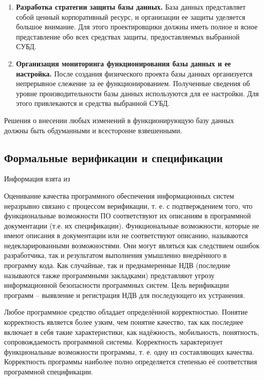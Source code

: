 \begin{enumerate}
    \item \textbf{Разработка стратегии защиты базы данных.}
        База данных представляет собой ценный корпоративный ресурс, и организации ее защиты уделяется большое
        внимание. Для этого проектировщики должны иметь полное и ясное представление обо всех средствах защиты,
        предоставляемых выбранной СУБД.

    \item \textbf{Организация мониторинга функционирования базы данных и ее настройка.}
        После создания физического проекта базы данных организуется непрерывное слежение за ее функционированием.
        Полученные сведения об уровне производительности базы данных используются для ее настройки. Для этого
        привлекаются и средства выбранной СУБД.
\end{enumerate}

Решения о внесении любых изменений в функционирующую базу данных должны быть обдуманными и всесторонне взвешенными.

\subsection{Формальные верификации и спецификации}
Информация взята из \autocite{Glukharev}

Оценивание качества программного обеспечения информационных систем неразрывно связано с процессом верификации,
т. е. с подтверждением того, что функциональные возможности ПО соответствуют их описаниям в программной документации
(т.е. их спецификации). Функциональные возможности, которые не имеют описания в документации или не соответствуют
описанию, называются недекларированными возможностями. Они могут являться как следствием ошибок разработчика,
так и результатом выполнения умышленно внедрённого в программу кода. Как случайные, так и преднамеренные НДВ
(последние называются также программными закладками) представляют угрозу информационной безопасности программных
систем. Цель верификации программ – выявление и регистрация НДВ для последующего их устранения.

Любое программное средство обладает определённой корректностью. Понятие корректность является более узким,
чем понятие качество, так как последнее включает в себя такие характеристики, как надёжность, мобильность,
понятность, сопровождаемость программной системы. Корректность характеризует функциональные возможности программы,
т. е. одну из составляющих качества. Корректность программы наиболее полно определяется степенью её соответствия
программной спецификации.

